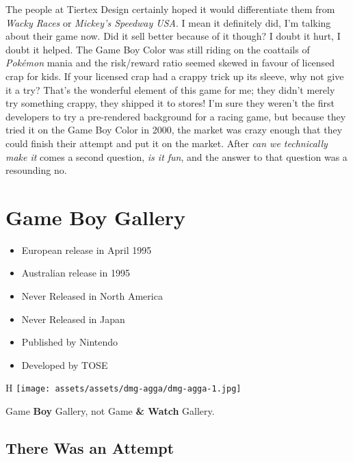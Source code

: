 \documentclass{book}
\begin{document}
The people at Tiertex Design certainly hoped it would differentiate them from \emph{Wacky Races} or \emph{Mickey’s Speedway USA}. I mean it definitely did, I’m talking about their game now. Did it sell better because of it though? I doubt it hurt, I doubt it helped. The Game Boy Color was still riding on the coattails of \emph{Pokémon} mania and the risk/reward ratio seemed skewed in favour of licensed crap for kids. If your licensed crap had a crappy trick up its sleeve, why not give it a try? That’s the wonderful element of this game for me; they didn’t merely try something crappy, they shipped it to stores! I’m sure they weren’t the first developers to try a pre-rendered background for a racing game, but because they tried it on the Game Boy Color in 2000, the market was crazy enough that they could finish their attempt and put it on the market. After \emph{can we technically make it} comes a second question, \emph{is it fun}, and the answer to that question was a resounding no.


\begingroup \chapter*{Game Boy Gallery} \endgroup

\begin{itemize} \setlength\itemsep{-0.4em}
\item European release in April 1995
\item Australian release in 1995
\item Never Released in North America
\item Never Released in Japan
\item Published by Nintendo
\item Developed by TOSE
\end{itemize}\noindent

\begin{wrapfigure}{H}{\linewidth}
\vskip 4pt
\centering \texttt{[image: assets/assets/dmg-agga/dmg-agga-1.jpg]}\par\pagetwodescription Game \textbf{Boy} Gallery, not Game \textbf{\& Watch} Gallery.\end{wrapfigure}
\clearpage

\FloatBarrier\needspace{5pt}\section*{There Was an Attempt}\nopagebreak[4]
\end{document}
